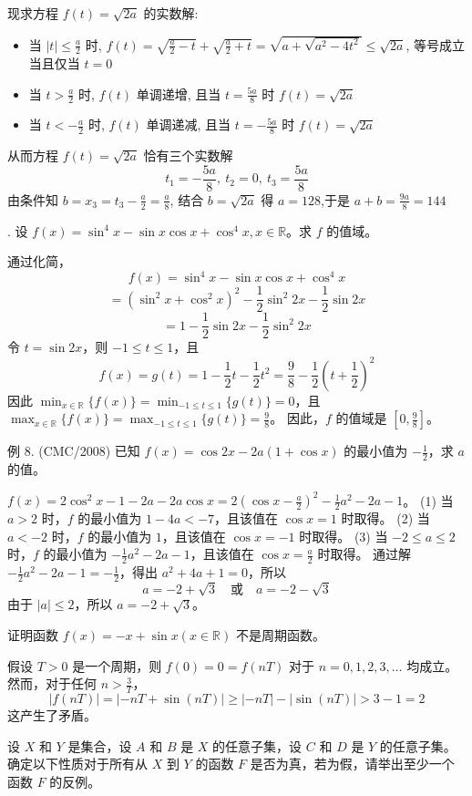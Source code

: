 \begin{questions}
\begin{solution}
        现求方程 $f(t)=\sqrt{2a}$ 的实数解:
        \begin{itemize}
            \item 当 $|t|\le\frac{a}{2}$ 时, $f(t)=\sqrt{\frac{a}{2}-t}+\sqrt{\frac{a}{2}+t}=\sqrt{a+\sqrt{a^2-4t^2}}\le\sqrt{2a}$, 等号成立当且仅当 $t=0$
            \item 当 $t>\frac{a}{2}$ 时, $f(t)$ 单调递增, 且当 $t=\frac{5a}{8}$ 时 $f(t)=\sqrt{2a}$
            \item 当 $t<-\frac{a}{2}$ 时, $f(t)$ 单调递减, 且当 $t=-\frac{5a}{8}$ 时 $f(t)=\sqrt{2a}$
        \end{itemize}
        从而方程 $f(t)=\sqrt{2a}$ 恰有三个实数解 $$t_1=-\frac{5a}{8},\ t_2=0,\ t_3=\frac{5a}{8}$$
        由条件知 $b=x_3=t_3-\frac{a}{2}=\frac{a}{8}$, 结合 $b=\sqrt{2a}$ 得 $a=128$,于是 $a+b=\frac{9a}{8}=144$
    \end{solution}  
    . 设 $f(x) = \sin^4 x - \sin x \cos x + \cos^4 x, x \in \mathbb{R}$。求 $f$ 的值域。
\begin{solution}
通过化简，
\[
f(x) = \sin^4 x - \sin x \cos x + \cos^4 x
\]
\[
= (\sin^2 x + \cos^2 x)^2 - \frac{1}{2} \sin^2 2x - \frac{1}{2} \sin 2x
\]
\[
= 1 - \frac{1}{2} \sin 2x - \frac{1}{2} \sin^2 2x
\]
令 $t = \sin 2x$，则 $-1 \le t \le 1$，且
\[
f(x) = g(t) = 1 - \frac{1}{2}t - \frac{1}{2}t^2 = \frac{9}{8} - \frac{1}{2}\left(t + \frac{1}{2}\right)^2
\]
因此 $\min_{x \in \mathbb{R}}\{f(x)\} = \min_{-1 \le t \le 1}\{g(t)\} = 0$，且 $\max_{x \in \mathbb{R}}\{f(x)\} = \max_{-1 \le t \le 1}\{g(t)\} = \frac{9}{8}$。
因此，$f$ 的值域是 $\left[0, \frac{9}{8}\right]$。
\end{solution}

例 8. (CMC/2008) 已知 $f(x) = \cos 2x - 2a(1 + \cos x)$ 的最小值为 $-\frac{1}{2}$，求 $a$ 的值。
\begin{solution}
$f(x) = 2 \cos^2 x - 1 - 2a - 2a \cos x = 2\left(\cos x - \frac{a}{2}\right)^2 - \frac{1}{2}a^2 - 2a - 1$。
(1) 当 $a > 2$ 时，$f$ 的最小值为 $1 - 4a < -7$，且该值在 $\cos x = 1$ 时取得。
(2) 当 $a < -2$ 时，$f$ 的最小值为 $1$，且该值在 $\cos x = -1$ 时取得。
(3) 当 $-2 \le a \le 2$ 时，$f$ 的最小值为 $-\frac{1}{2}a^2 - 2a - 1$，且该值在 $\cos x = \frac{a}{2}$ 时取得。
通过解 $-\frac{1}{2}a^2 - 2a - 1 = -\frac{1}{2}$，得出 $a^2 + 4a + 1 = 0$，所以
\[
a = -2 + \sqrt{3} \quad \text{或} \quad a = -2 - \sqrt{3}
\]
由于 $|a| \le 2$，所以 $a = -2 + \sqrt{3}$。
\end{solution}

    \question 证明函数 $f(x) = -x + \sin x (x \in \mathbb{R})$ 不是周期函数。
\begin{solution}
假设 $T > 0$ 是一个周期，则 $f(0) = 0 = f(nT)$ 对于 $n = 0, 1, 2, 3, \dots$ 均成立。
然而，对于任何 $n > \frac{3}{T}$，
\[
|f(nT)| = |-nT + \sin(nT)| \ge |-nT| - |\sin(nT)| > 3 - 1 = 2
\]
这产生了矛盾。
\end{solution}
    \question
设 $X$ 和 $Y$ 是集合，设 $A$ 和 $B$ 是 $X$ 的任意子集，设 $C$ 和 $D$ 是 $Y$ 的任意子集。确定以下性质对于所有从 $X$ 到 $Y$ 的函数 $F$ 是否为真，若为假，请举出至少一个函数 $F$ 的反例。


\end{questions}
